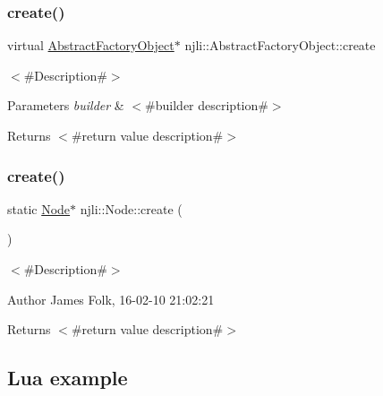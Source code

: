 \begin{DoxyCodeInclude}
\end{DoxyCodeInclude}
\mbox{\label{classnjli_1_1_node_a83a8876ae63b92804004cf3febe76573}} 
\subsubsection{\texorpdfstring{create()}{create()}\hspace{0.1cm}{\footnotesize\ttfamily [1/3]}}
{\footnotesize\ttfamily virtual \mbox{\hyperlink{classnjli_1_1_abstract_factory_object}{Abstract\+Factory\+Object}}$\ast$ njli\+::\+Abstract\+Factory\+Object\+::create}

$<$\#\+Description\#$>$


\begin{DoxyParams}{Parameters}
{\em builder} & $<$\#builder description\#$>$\\
\hline
\end{DoxyParams}
\begin{DoxyReturn}{Returns}
$<$\#return value description\#$>$ 
\end{DoxyReturn}
\mbox{\label{classnjli_1_1_node_a955a287409afef586899ff05e4340fc7}} 
\subsubsection{\texorpdfstring{create()}{create()}\hspace{0.1cm}{\footnotesize\ttfamily [2/3]}}
{\footnotesize\ttfamily static \mbox{\hyperlink{classnjli_1_1_node}{Node}}$\ast$ njli\+::\+Node\+::create (\begin{DoxyParamCaption}{ }\end{DoxyParamCaption})\hspace{0.3cm}{\ttfamily [static]}}



$<$\#\+Description\#$>$ 

\begin{DoxyAuthor}{Author}
James Folk, 16-\/02-\/10 21\+:02\+:21
\end{DoxyAuthor}
\begin{DoxyReturn}{Returns}
$<$\#return value description\#$>$
\end{DoxyReturn}
\hypertarget{classnjli_1_1_steering_behavior_wander_ex1}{}\subsection{Lua example}\label{classnjli_1_1_steering_behavior_wander_ex1}

